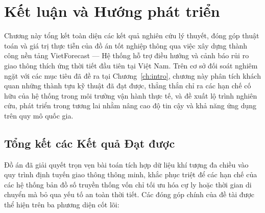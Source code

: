\chapter{Kết luận và Hướng phát triển}
\label{ch:conclusion}

Chương này tổng kết toàn diện các kết quả nghiên cứu lý thuyết, đóng góp thuật toán và giá trị thực tiễn của đồ án tốt nghiệp thông qua việc xây dựng thành công nền tảng VietForecast --- Hệ thống hỗ trợ điều hướng và cảnh báo rủi ro giao thông thích ứng thời tiết đầu tiên tại Việt Nam. Trên cơ sở đối soát nghiêm ngặt với các mục tiêu đã đề ra tại Chương~\ref{ch:intro}, chương này phân tích khách quan những thành tựu kỹ thuật đã đạt được, thẳng thắn chỉ ra các hạn chế cố hữu của hệ thống trong môi trường vận hành thực tế, và đề xuất lộ trình nghiên cứu, phát triển trong tương lai nhằm nâng cao độ tin cậy và khả năng ứng dụng trên quy mô quốc gia.

\section{Tổng kết các Kết quả Đạt được}
\label{sec:summary_achievements}

Đồ án đã giải quyết trọn vẹn bài toán tích hợp dữ liệu khí tượng đa chiều vào quy trình định tuyến giao thông thông minh, khắc phục triệt để các hạn chế của các hệ thống bản đồ số truyền thống vốn chỉ tối ưu hóa cự ly hoặc thời gian di chuyển mà bỏ qua yếu tố an toàn thời tiết. Các đóng góp chính của đề tài được thể hiện trên ba phương diện cốt lõi:

